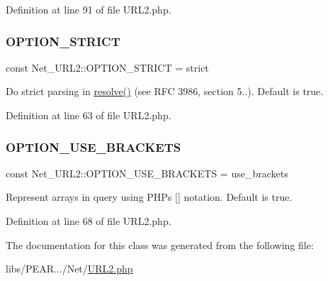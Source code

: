 Definition at line 91 of file U\+R\+L2.\+php.

\mbox{\label{classNet__URL2_a766955033bdccec7175d0694df62a1a9}} 
\subsubsection{\texorpdfstring{O\+P\+T\+I\+O\+N\+\_\+\+S\+T\+R\+I\+CT}{OPTION\_STRICT}}
{\footnotesize\ttfamily const Net\+\_\+\+U\+R\+L2\+::\+O\+P\+T\+I\+O\+N\+\_\+\+S\+T\+R\+I\+CT = \textquotesingle{}strict\textquotesingle{}}

Do strict parsing in \hyperlink{classNet__URL2_a8630ab79fad624b2fd5b0df2e9123c0a}{resolve()} (see R\+FC 3986, section 5..). Default is true. 

Definition at line 63 of file U\+R\+L2.\+php.

\mbox{\label{classNet__URL2_a864182f067e5df22055afc3a0dfe5a57}} 
\subsubsection{\texorpdfstring{O\+P\+T\+I\+O\+N\+\_\+\+U\+S\+E\+\_\+\+B\+R\+A\+C\+K\+E\+TS}{OPTION\_USE\_BRACKETS}}
{\footnotesize\ttfamily const Net\+\_\+\+U\+R\+L2\+::\+O\+P\+T\+I\+O\+N\+\_\+\+U\+S\+E\+\_\+\+B\+R\+A\+C\+K\+E\+TS = \textquotesingle{}use\+\_\+brackets\textquotesingle{}}

Represent arrays in query using P\+HP\textquotesingle{}s \mbox{[}\mbox{]} notation. Default is true. 

Definition at line 68 of file U\+R\+L2.\+php.



The documentation for this class was generated from the following file\+:\begin{DoxyCompactItemize}
\item 
libs/\+P\+E\+A\+R.../\+Net/\hyperlink{URL2_8php}{U\+R\+L2.\+php}\end{DoxyCompactItemize}
